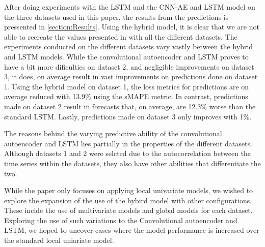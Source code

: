 After doing experiments with the LSTM and the CNN-AE and LSTM model on the three datasets used in this paper,
the results from the predictions is pressented in \cref{section:Results}.
Using the hybrid model, it is clear that we are not able to recreate the values presented in \cite{Zhao2019}
with all the different datasets.
The experiments conducted on the different datasets vary vastly between the hybrid and LSTM models.
While the convolutional autoencoder and LSTM proves to have a bit more dificulties on dataset 2, and negligible improvements on dataset 3,
it does, on average result in vast improvements on predictions done on dataset 1.
Using the hybrid model on dataset 1, the loss metrics for predictions are on average reduced with 13.9\% using the sMAPE metric.
In contrast, predictions made on dataset 2 result in forecasts that, on average, are 12.3\% worse than the standard LSTM.
Lastly, predictions made on dataset 3 only improves with 1\%.

The reasons behind the varying predictive ability of the convolutional autoencoder and LSTM lies partially
in the properties of the different datasets.
Although datasets 1 and 2 were selcted due to the autocorrelation between the time series within the datasets,
they also have other abilities that differentiate the two.





While the paper \cite{Zhao2019} only focuses on applying local univariate models,
we wished to explore the expansion of the use of the hybird model with other configurations.
These inclde the use of multivariate models and global models for each dataset.
Exploring the use of such variations to the Convolutional autoencoder and LSTM,
we hoped to uncover cases where the model performance is increased over the standard local uniariate model.



